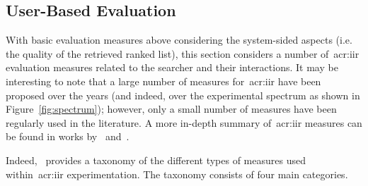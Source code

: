 \subsection{User-Based Evaluation}\label{sec:ir_background:evaluation:user}
With basic evaluation measures above considering the system-sided aspects (i.e. the quality of the retrieved ranked list), this section considers a number of~\gls{acr:iir} evaluation measures related to the searcher and their interactions. It may be interesting to note that a large number of measures for~\gls{acr:iir} have been proposed over the years (and indeed, over the experimental spectrum as shown in Figure~\ref{fig:spectrum}); however, only a small number of measures have been regularly used in the literature. A more in-depth summary of~\gls{acr:iir} measures can be found in works by~\cite{su1992iir_measures} and~\cite{kelly2009iir}.

Indeed,~\cite{kelly2009iir} provides a taxonomy of the different types of measures used within~\gls{acr:iir} experimentation. The taxonomy consists of four main categories.


